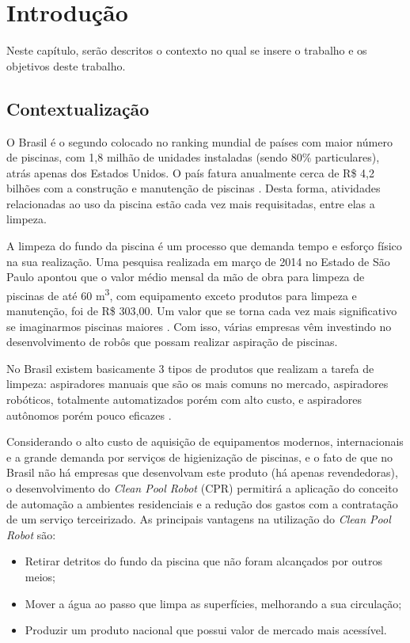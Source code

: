 \chapter{Introdução}
Neste capítulo, serão descritos o contexto no qual se insere o trabalho e os
objetivos deste trabalho.

\section{Contextualização}
O Brasil é o segundo colocado no ranking mundial de países com maior número de
piscinas, com 1,8 milhão de unidades instaladas (sendo 80\% particulares), atrás
apenas dos Estados Unidos. O país fatura anualmente cerca de R\$ 4,2 bilhões com
a construção e manutenção de piscinas \cite{portalfatorbrasil2013}. Desta forma,
atividades relacionadas ao uso da piscina estão cada vez mais requisitadas, entre
elas a limpeza.

A limpeza do fundo da piscina é um processo que demanda tempo e esforço físico na
sua realização. Uma pesquisa realizada em março de 2014 no Estado de São Paulo
apontou que o valor médio mensal da mão de obra para limpeza de piscinas de até
60 m\textsuperscript{3}, com equipamento exceto produtos para limpeza e manutenção,
foi de R\$ 303,00. Um valor que se torna cada vez mais significativo se imaginarmos
piscinas maiores \cite{datafolha2014}. Com isso, várias empresas vêm investindo
no desenvolvimento de robôs que possam realizar aspiração de piscinas. 

No Brasil existem basicamente 3 tipos de produtos que realizam a tarefa de limpeza:
aspiradores manuais que são os mais comuns no mercado, aspiradores robóticos,
totalmente automatizados porém com alto custo, e aspiradores autônomos porém pouco
eficazes \cite{miura2006}.

Considerando o alto custo de aquisição de equipamentos modernos, internacionais
e a grande demanda por serviços de higienização de piscinas, e o fato de que
no Brasil não há empresas que desenvolvam este produto (há apenas revendedoras),
o desenvolvimento do \textit{Clean Pool Robot} (\textsf{CPR}) permitirá a
aplicação do conceito de automação a ambientes residenciais e a redução dos
gastos com a contratação de um serviço terceirizado. As principais vantagens
na utilização do \textit{Clean Pool Robot} são:

\begin{itemize}
\item Retirar detritos do fundo da piscina que não foram alcançados por outros
meios;
\item Mover a água ao passo que limpa as superfícies, melhorando a sua circulação;
\item Produzir um produto nacional que possui valor de mercado mais acessível.
\end{itemize}

